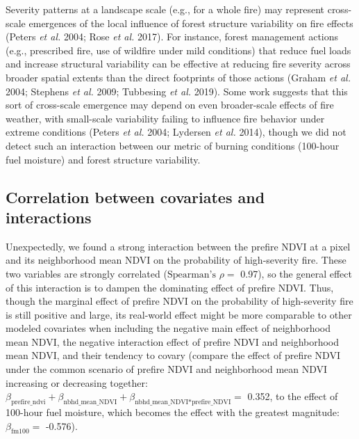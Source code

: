 \documentclass[]{article}
\begin{document}
Severity patterns at a landscape scale (e.g., for a whole fire) may
represent cross-scale emergences of the local influence of forest
structure variability on fire effects (Peters \emph{et al.} 2004; Rose
\emph{et al.} 2017). For instance, forest management actions (e.g.,
prescribed fire, use of wildfire under mild conditions) that reduce fuel
loads and increase structural variability can be effective at reducing
fire severity across broader spatial extents than the direct footprints
of those actions (Graham \emph{et al.} 2004; Stephens \emph{et al.}
2009; Tubbesing \emph{et al.} 2019). Some work suggests that this sort
of cross-scale emergence may depend on even broader-scale effects of
fire weather, with small-scale variability failing to influence fire
behavior under extreme conditions (Peters \emph{et al.} 2004; Lydersen
\emph{et al.} 2014), though we did not detect such an interaction
between our metric of burning conditions (100-hour fuel moisture) and
forest structure variability.

\hypertarget{correlation-between-covariates-and-interactions}{%
\subsection{Correlation between covariates and
interactions}\label{correlation-between-covariates-and-interactions}}

Unexpectedly, we found a strong interaction between the prefire NDVI at
a pixel and its neighborhood mean NDVI on the probability of
high-severity fire. These two variables are strongly correlated
(\(\text{Spearman's }\rho=\) 0.97), so the general effect of this
interaction is to dampen the dominating effect of prefire NDVI. Thus,
though the marginal effect of prefire NDVI on the probability of
high-severity fire is still positive and large, its real-world effect
might be more comparable to other modeled covariates when including the
negative main effect of neighborhood mean NDVI, the negative interaction
effect of prefire NDVI and neighborhood mean NDVI, and their tendency to
covary (compare the effect of prefire NDVI under the common scenario of
prefire NDVI and neighborhood mean NDVI increasing or decreasing
together:
\(\beta_{\text{prefire\_ndvi}}+\beta_{\text{nbhd\_mean\_NDVI}}+\beta_{\text{nbhd\_mean\_NDVI*prefire\_NDVI}}=\)
0.352, to the effect of 100-hour fuel moisture, which becomes the effect
with the greatest magnitude: \(\beta_{\text{fm100}}=\) -0.576).
\end{document}

